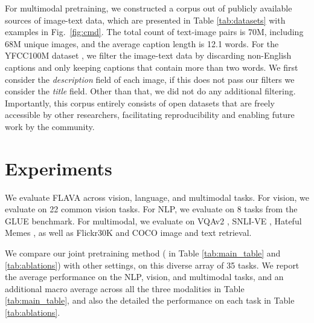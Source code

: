 \documentclass[10pt,twocolumn,letterpaper]{article}
\begin{document}
For multimodal pretraining, we constructed a corpus out of publicly available sources of image-text data, which are presented in Table \ref{tab:datasets} with examples in Fig.~\ref{fig:cmd}. The total count of text-image pairs is 70M, including 68M unique images, and the average caption length is 12.1 words. For the YFCC100M dataset \cite{yfcc100m}, we filter the image-text data by discarding non-English captions and only keeping captions that contain more than two words. We first consider the \textit{description} field of each image, if this does not pass our filters we consider the \textit{title} field. Other than that, we did not do any additional filtering. Importantly, this corpus entirely consists of open datasets that are freely accessible by other researchers, facilitating reproducibility and enabling future work by the community.

\section{Experiments}

We evaluate FLAVA across vision, language, and multimodal tasks. For vision, we evaluate on 22 common vision tasks. For NLP, we evaluate on 8 tasks from the GLUE \cite{wang2019glue} benchmark. For multimodal, we evaluate on VQAv2 \cite{goyal2017making}, SNLI-VE \cite{xie2019visual}, Hateful Memes \cite{kiela2020hateful}, as well as Flickr30K \cite{flickr30k} and COCO \cite{coco} image and text retrieval.

We compare our joint pretraining method ( in Table \ref{tab:main_table} and \ref{tab:ablations}) with other settings, on this diverse array of 35 tasks. We report the average performance on the NLP, vision, and multimodal tasks, and an additional macro average across all the three modalities in Table \ref{tab:main_table}, and also the detailed the performance on each task in Table \ref{tab:ablations}.
\end{document}
